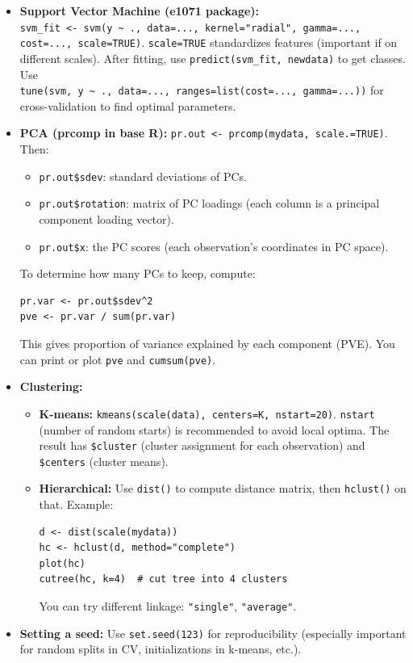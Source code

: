 \documentclass[11pt]{article}
\begin{document}
\begin{itemize}
    \item \textbf{Support Vector Machine (e1071 package):} \\ \verb|svm_fit <- svm(y ~ ., data=..., kernel="radial", gamma=..., cost=..., scale=TRUE)|. \texttt{scale=TRUE} standardizes features (important if on different scales). After fitting, use \verb|predict(svm_fit, newdata)| to get classes. Use \\ \verb|tune(svm, y ~ ., data=..., ranges=list(cost=..., gamma=...))| for cross-validation to find optimal parameters.
    
    \item \textbf{PCA (prcomp in base R):} \verb|pr.out <- prcomp(mydata, scale.=TRUE)|. Then:
    \begin{itemize}
        \item \texttt{pr.out\$sdev}: standard deviations of PCs.
        \item \texttt{pr.out\$rotation}: matrix of PC loadings (each column is a principal component loading vector).
        \item \texttt{pr.out\$x}: the PC scores (each observation's coordinates in PC space).
    \end{itemize}
    To determine how many PCs to keep, compute:
    \begin{verbatim}
pr.var <- pr.out$sdev^2
pve <- pr.var / sum(pr.var)
    \end{verbatim}
    This gives proportion of variance explained by each component (PVE). You can print or plot \texttt{pve} and \texttt{cumsum(pve)}.
    
    \item \textbf{Clustering:}
    \begin{itemize}
        \item \textbf{K-means:} \verb|kmeans(scale(data), centers=K, nstart=20)|. \texttt{nstart} (number of random starts) is recommended to avoid local optima. The result has \texttt{\$cluster} (cluster assignment for each observation) and \texttt{\$centers} (cluster means).
        
        \item \textbf{Hierarchical:} Use \verb|dist()| to compute distance matrix, then \verb|hclust()| on that. Example:
        \begin{verbatim}
d <- dist(scale(mydata))
hc <- hclust(d, method="complete")
plot(hc)
cutree(hc, k=4)  # cut tree into 4 clusters
        \end{verbatim}
        You can try different linkage: \texttt{"single"}, \texttt{"average"}.
    \end{itemize}
    
    \item \textbf{Setting a seed:} Use \verb|set.seed(123)| for reproducibility (especially important for random splits in CV, initializations in k-means, etc.).
\end{itemize}
\end{document}
